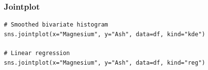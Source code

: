 \documentclass[pdf]{beamer}
\begin{document}
\begin{frame}[fragile]
\frametitle{Jointplot}


\begin{lstlisting}[style=python]
# Smoothed bivariate histogram
sns.jointplot(x="Magnesium", y="Ash", data=df, kind="kde")

# Linear regression
sns.jointplot(x="Magnesium", y="Ash", data=df, kind="reg")
\end{lstlisting}

\vspace{-0.7cm}
\begin{center}
\end{center}

\end{frame}
\end{document}
